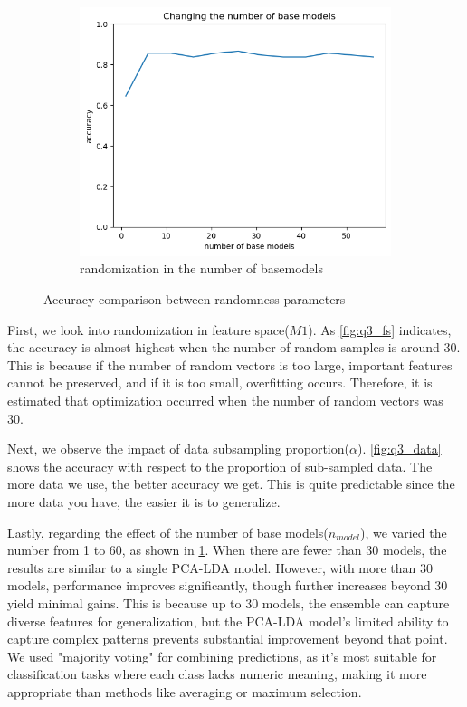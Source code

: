 \begin{figure}[htbp]
\begin{subfigure}[t]{0.3\linewidth}
		\centering
		\includegraphics[width=\linewidth]{image/q3_basemodel.png}
		\caption{randomization in the number of basemodels}
		\label{fig:q3_base}
	\end{subfigure}
	\caption{Accuracy comparison between randomness parameters}
	\label{fig:q3_random}
\end{figure}
\vspace{-0.2cm}

First, we look into randomization in feature space($M1$). As \cref{fig:q3_fs} indicates, the accuracy is almost highest when the number of random samples is around 30. This is because if the number of random vectors is too large, important features cannot be preserved, and if it is too small, overfitting occurs. Therefore, it is estimated that optimization occurred when the number of random vectors was 30.

Next, we observe the impact of data subsampling proportion($\alpha$). \cref{fig:q3_data} shows the accuracy with respect to the proportion of sub-sampled data. The more data we use, the better accuracy we get. This is quite predictable since the more data you have, the easier it is to generalize.

Lastly, regarding the effect of the number of base models($n_{model}$), we varied the number from 1 to 60, as shown in \cref{fig:q3_base}. When there are fewer than 30 models, the results are similar to a single PCA-LDA model. However, with more than 30 models, performance improves significantly, though further increases beyond 30 yield minimal gains. This is because up to 30 models, the ensemble can capture diverse features for generalization, but the PCA-LDA model’s limited ability to capture complex patterns prevents substantial improvement beyond that point. We used "majority voting" for combining predictions, as it’s most suitable for classification tasks where each class lacks numeric meaning, making it more appropriate than methods like averaging or maximum selection.

